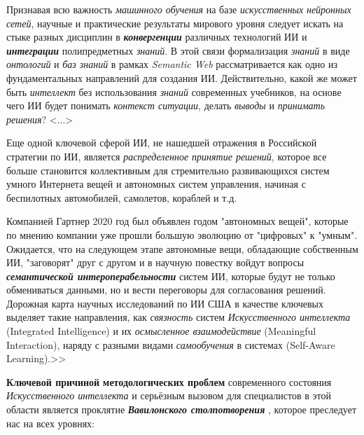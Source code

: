 Признавая всю важность \textit{машинного обучения} на базе \textit{искусственных} \textit{нейронных сетей}, научные и практические результаты мирового уровня следует искать на стыке разных дисциплин в \textbf{\textit{конвергенции}} различных технологий ИИ и \textbf{\textit{интеграции}} полипредметных \textit{знаний}. В этой связи формализация \textit{знаний} в виде \textit{онтологий} и \textit{баз знаний} в рамках \textit{Semantic Web} рассматривается как одно из фундаментальных направлений для создания ИИ. Действительно, какой же может быть \textit{интеллект} без использования \textit{знаний} современных учебников, на основе чего ИИ будет понимать \textit{контекст ситуации}, делать \textit{выводы} и \textit{принимать решения}? <...>

Еще одной ключевой сферой ИИ, не нашедшей отражения в Российской стратегии по ИИ, является \textit{распределенное принятие решений}, которое все больше становится коллективным для стремительно развивающихся систем умного Интернета вещей и автономных систем управления, начиная с беспилотных автомобилей, самолетов, кораблей и т.д.

Компанией Гартнер 2020 год был объявлен годом "автономных вещей"{}, которые по мнению компании уже прошли большую эволюцию от "цифровых"{} к "умным"{}. Ожидается, что на следующем этапе автономные вещи, обладающие собственным ИИ, "заговорят"{} друг с другом и в научную повестку войдут вопросы \textbf{\textit{семантической интероперабельности}} систем ИИ, которые будут не только обмениваться данными, но и вести переговоры для согласования решений. Дорожная карта научных исследований по ИИ США в качестве ключевых выделяет такие направления, как \textit{связность} систем \textit{Искусственного интеллекта} (Integrated Intelligence) и их \textit{осмысленное взаимодействие} (Meaningful Interaction), наряду с разными видами \textit{самообучения} в системах (Self-Aware Learning).>>
\begin{SCn}
\end{SCn}

\textbf{Ключевой причиной} \textbf{методологических проблем} современного состояния \textit{Искусственного интеллекта} и серьёзным вызовом для специалистов в этой области является проклятие \textbf{\textit{Вавилонского столпотворения}} , которое преследует нас на всех уровнях:

